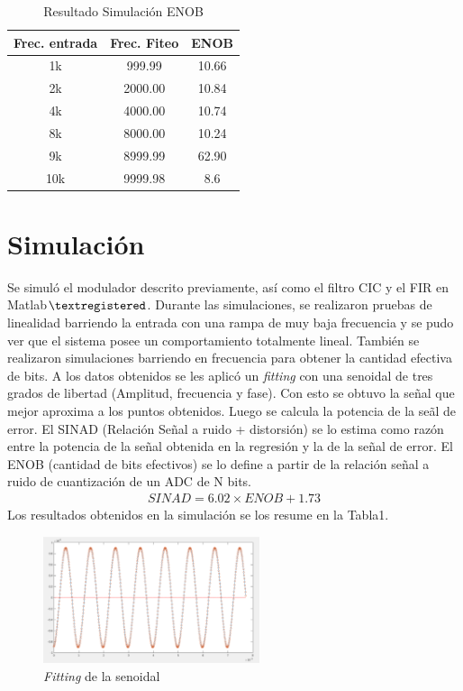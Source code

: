 \documentclass[a4paper,conference]{IEEEtran}
\begin{document}
\begin{table}[!b]
\renewcommand{\arraystretch}{1.3}
\caption{Resultado Simulaci\'on ENOB}
\label{Tabla_1}
\centering
\begin{tabular}{|c|c|c|}
\hline
Frec. entrada & Frec. Fiteo & ENOB\\
\hline
1k & 999.99 & 10.66\\
\hline
2k & 2000.00 & 10.84\\
\hline
4k & 4000.00 & 10.74\\
\hline
8k & 8000.00 & 10.24\\
\hline
9k & 8999.99 & 62.90\\
\hline
10k & 9999.98 & 8.6\\
\hline
\end{tabular}
\end{table}

\section{Simulaci\'on}
Se simul\'o el modulador descrito previamente, as\'i como el filtro CIC y el FIR en Matlab$\textregistered$.
Durante las simulaciones, se realizaron pruebas de linealidad barriendo la entrada con una rampa de muy baja frecuencia y se pudo ver que el sistema posee un comportamiento totalmente lineal.
Tambi\'en se realizaron simulaciones barriendo en frecuencia para obtener la cantidad efectiva de bits.
A los datos obtenidos se les aplic\'o un \textit{fitting} con una senoidal de tres grados de libertad (Amplitud, frecuencia y fase). Con esto se obtuvo la se\~nal que mejor aproxima a los puntos obtenidos. Luego se calcula la potencia de la se\~al de error. El SINAD (Relaci\'on Se\~nal a ruido + distorsi\'on) se lo estima como raz\'on entre la potencia de la se\~nal obtenida en la regresi\'on y la de la señal de error. El ENOB (cantidad de bits efectivos) se lo define a partir de la relaci\'on se\~nal a ruido de cuantizaci\'on de un ADC de N bits.
\begin{align}
SINAD=6.02 \times ENOB + 1.73
\end{align}
Los resultados obtenidos en la simulaci\'on se los resume en la Tabla1.

\begin{figure}[!t]
\centering
\includegraphics[width=2.5in]{Simulacion_fiteo}
\caption{\textit{Fitting} de la senoidal}
\label{fig_11}
\end{figure}
\end{document}
